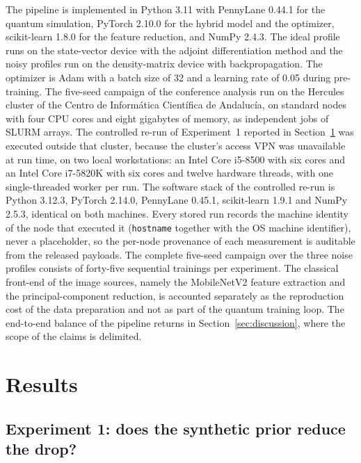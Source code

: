 \documentclass[preprint,number,sort&compress]{elsarticle}
\begin{document}
The pipeline is implemented in Python 3.11 with PennyLane 0.44.1 for the
quantum simulation, PyTorch 2.10.0 for the hybrid model and the optimizer,
scikit-learn 1.8.0 for the feature reduction, and NumPy 2.4.3. The ideal
profile runs on the state-vector device with the adjoint differentiation
method and the noisy profiles run on the density-matrix device with
backpropagation. The optimizer is Adam with a batch size of 32 and a
learning rate of 0.05 during pre-training. The five-seed campaign of the
conference analysis run on the Hercules cluster of the Centro de
Inform\'atica Cient\'ifica de Andaluc\'ia, on standard nodes with four CPU
cores and eight gigabytes of memory, as independent jobs of SLURM arrays.
The controlled re-run of Experiment~1 reported in
Section~\ref{sec:results} was executed outside that cluster, because the
cluster's access VPN was unavailable at run time, on two local workstations:
an Intel Core i5-8500 with six cores and an Intel Core i7-5820K with six
cores and twelve hardware threads, with one single-threaded worker per
run. The software stack of the controlled re-run is Python 3.12.3, PyTorch
2.14.0, PennyLane 0.45.1, scikit-learn 1.9.1 and NumPy 2.5.3, identical on
both machines. Every stored run records the machine identity of the node
that executed it (\texttt{hostname} together with the OS machine
identifier), never a placeholder, so the per-node provenance of each
measurement is auditable from the released payloads. The complete
five-seed campaign over the three noise profiles consists of forty-five
sequential trainings per experiment. The classical front-end of the image sources, namely the
MobileNetV2 feature extraction and the principal-component reduction, is
accounted separately as the reproduction cost of the data preparation and
not as part of the quantum training loop. The end-to-end balance of the
pipeline returns in Section~\ref{sec:discussion}, where the scope of the
claims is delimited.

\section{Results}
\label{sec:results}

\subsection{Experiment 1: does the synthetic prior reduce the drop?}
\end{document}
